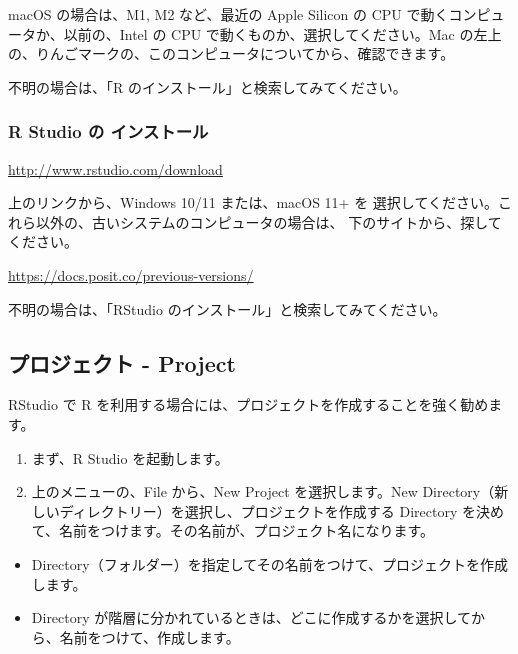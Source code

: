 \documentclass[
]{bxjsbook}
\providecommand{\tightlist}{%
  \setlength{\itemsep}{0pt}\setlength{\parskip}{0pt}}
\theoremstyle{definition}
\theoremstyle{definition}
\theoremstyle{definition}
\theoremstyle{definition}
\theoremstyle{remark}
\begin{document}
macOS の場合は、M1, M2 など、最近の Apple Silicon の CPU で動くコンピュータか、以前の、Intel の CPU で動くものか、選択してください。Mac の左上の、りんごマークの、このコンピュータについてから、確認できます。

不明の場合は、「R のインストール」と検索してみてください。

\hypertarget{r-studio-ux306e-ux30a4ux30f3ux30b9ux30c8ux30fcux30eb}{%
\subsubsection{R Studio の インストール}\label{r-studio-ux306e-ux30a4ux30f3ux30b9ux30c8ux30fcux30eb}}

\url{http://www.rstudio.com/download}

上のリンクから、Windows 10/11 または、macOS 11+ を 選択してください。これら以外の、古いシステムのコンピュータの場合は、 下のサイトから、探してください。

\url{https://docs.posit.co/previous-versions/}

不明の場合は、「RStudio のインストール」と検索してみてください。

\hypertarget{ux30d7ux30edux30b8ux30a7ux30afux30c8---project}{%
\subsection{プロジェクト - Project}\label{ux30d7ux30edux30b8ux30a7ux30afux30c8---project}}

RStudio で R を利用する場合には、プロジェクトを作成することを強く勧めます。

\begin{enumerate}
\def\labelenumi{\arabic{enumi}.}
\item
  まず、R Studio を起動します。
\item
  上のメニューの、File から、New Project を選択します。New Directory（新しいディレクトリー）を選択し、プロジェクトを作成する Directory を決めて、名前をつけます。その名前が、プロジェクト名になります。
\end{enumerate}

\begin{itemize}
\tightlist
\item
  Directory（フォルダー）を指定してその名前をつけて、プロジェクトを作成します。
\item
  Directory が階層に分かれているときは、どこに作成するかを選択してから、名前をつけて、作成します。
\end{itemize}
\end{document}
